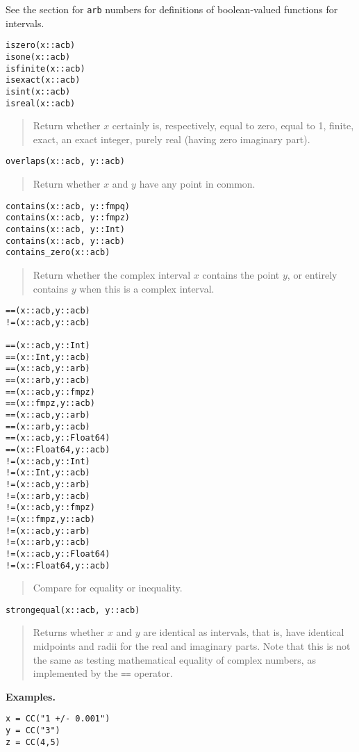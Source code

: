 \documentclass[a4paper,10pt]{article}
\newcommand{\code}{\lstinline}
\newcommand{\desc}[1]{\vspace{-3mm}\begin{quote}#1\end{quote}}
\begin{document}
{{See the section for \code{arb} numbers for definitions of boolean-valued
functions for intervals.

\begin{lstlisting}
iszero(x::acb)
isone(x::acb)
isfinite(x::acb)
isexact(x::acb)
isint(x::acb)
isreal(x::acb)
\end{lstlisting}

\desc{Return whether $x$ certainly is, respectively, equal to zero,
equal to 1, finite, exact, an exact integer, purely real (having zero
imaginary part).}

\begin{lstlisting}
overlaps(x::acb, y::acb)
\end{lstlisting}

\desc{Return whether $x$ and $y$ have any point in common.}

\begin{lstlisting}
contains(x::acb, y::fmpq)
contains(x::acb, y::fmpz)
contains(x::acb, y::Int)
contains(x::acb, y::acb)
contains_zero(x::acb)
\end{lstlisting}

\desc{Return whether the complex interval $x$ contains the point $y$,
or entirely contains $y$ when this is a complex interval.}

\begin{lstlisting}
==(x::acb,y::acb)
!=(x::acb,y::acb)

==(x::acb,y::Int)
==(x::Int,y::acb)
==(x::acb,y::arb)
==(x::arb,y::acb)
==(x::acb,y::fmpz)
==(x::fmpz,y::acb)
==(x::acb,y::arb)
==(x::arb,y::acb)
==(x::acb,y::Float64)
==(x::Float64,y::acb)
!=(x::acb,y::Int)
!=(x::Int,y::acb)
!=(x::acb,y::arb)
!=(x::arb,y::acb)
!=(x::acb,y::fmpz)
!=(x::fmpz,y::acb)
!=(x::acb,y::arb)
!=(x::arb,y::acb)
!=(x::acb,y::Float64)
!=(x::Float64,y::acb)
\end{lstlisting}

\desc{Compare for equality or inequality.}

\begin{lstlisting}
strongequal(x::acb, y::acb)
\end{lstlisting}

\desc{Returns whether $x$ and $y$ are identical as intervals, that is,
have identical midpoints and radii for the real and imaginary parts.
Note that this is
not the same as testing mathematical equality of complex numbers,
as implemented by the \code{==} operator.}

\textbf{Examples.}

\begin{lstlisting}
x = CC("1 +/- 0.001")
y = CC("3")
z = CC(4,5)


\end{lstlisting}}}
\end{document}
